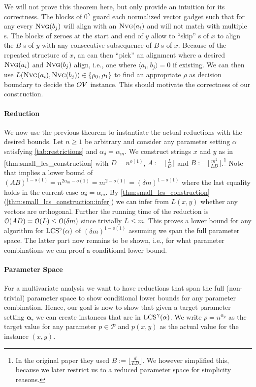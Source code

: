 We will not prove this theorem here, but only provide an intuition for its correctness.
The blocks of $0^\gamma$ guard each normalized vector gadget such that for any \lcs{} every $\text{\textsc{Nvg}}(b_j)$ will align with an $\text{\textsc{Nvg}}(a_i)$ and will not match with multiple \nvgName{}s.
The blocks of zeroes at the start and end of $y$ allow to \enquote{skip} \nvgName{}s of $x$ to align the $B$ \nvgName{}s of $y$ with any consecutive subsequence of $B$ \nvgName{}s of $x$.
Because of the repeated structure of $x$, an \lcs{} can then \enquote{pick} an alignment where a desired $\text{\textsc{Nvg}}(a_i)$ and $\text{\textsc{Nvg}}(b_j)$ align, i.e., one where $\langle a_i, b_j \rangle = 0$ if existing.
We can then use $L(\text{\textsc{Nvg}}(a_i), \text{\textsc{Nvg}}(b_j)) \in \{\rho_0, \rho_1\}$ to find an appropriate $\rho$ as decision boundary to decide the $OV$ instance.
This should motivate the correctness of our construction.


\paragraph*{Reduction}
We now use the previous theorem to instantiate the actual reductions with the desired bounds.
Let $n \geq 1$ be arbitrary and consider any parameter setting $\alpha$ satisfying \autoref{tab:restrictions} and $\alpha_\delta = \alpha_m$.
We construct strings $x$ and $y$ as in \autoref{thm:small_lcs_construction} with $D = n^{o(1)}$, $A := \lfloor \frac{L}{D} \rfloor$ and $B := \lfloor \frac{m^2}{LD} \rfloor$.\footnote{In the original paper they used $B := \lfloor \frac{d}{LD} \rfloor$. We however simplified this, because we later restrict us to a reduced parameter space for simplicity reasons.}
Note that \uovh{} implies a lower bound of $(AB)^{1-o(1)} = n^{2\alpha_m - o(1)} = m^{2 - o(1)} = (\delta m)^{1-o(1)}$ where the last equality holds in the current case $\alpha_\delta = \alpha_m$.
By \autoref{thm:small_lcs_construction} (\ref{thm:small_lcs_construction:infer}) we can infer from $L(x,y)$ whether any vectors are orthogonal.
Further the running time of the reduction is $\mathcal{O}(AD) = \mathcal{O}(L) \leq \mathcal{O}(\delta m)$ since trivially $L \leq m$.
This proves a lower bound for any algorithm for $\text{LCS}^\gamma(\mathbb{\alpha})$ of $(\delta m)^{1-o(1)}$ assuming we span the full parameter space.
The latter part now remains to be shown, i.e., for what \lcs{} parameter combinations we can proof a conditional lower bound.



\paragraph*{Parameter Space}
For a multivariate analysis we want to have reductions that span the full (non-trivial) parameter space to show conditional lower bounds for any parameter combination.
Hence, our goal is now to show that given a target parameter setting $\mathbf{\alpha}$, we can create instances that are in $\text{LCS}^\gamma(\mathbf{\alpha})$.
We write $p = n^{\alpha_p}$ as the target value for any parameter $p \in \mathcal{P}$ and $p(x,y)$ as the actual value for the \lcs{} instance $(x,y)$.

